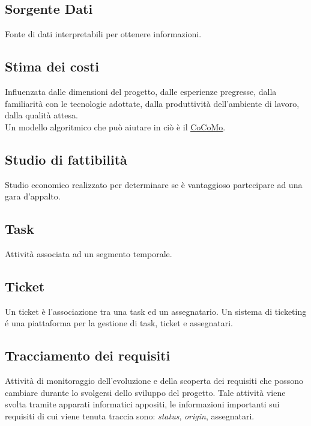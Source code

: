 	\subsection{Sorgente Dati}
	\label{sec:sorgentedati}
	Fonte di dati interpretabili per ottenere informazioni.
	
	
	\subsection{Stima dei costi}
	\label{sec:stimacosti}
	Influenzata dalle dimensioni del progetto, dalle esperienze pregresse, dalla familiarità con le tecnologie adottate, dalla produttività dell'ambiente di lavoro, dalla qualità attesa. \\Un modello algoritmico che può aiutare in ciò è il \underline{\hyperref[sec:cocomo]{CoCoMo}}.

	
	\subsection{Studio di fattibilità}
	\label{sec:studiofattibilita}
	Studio economico realizzato per determinare se è vantaggioso partecipare ad una gara d'appalto.
	
	
	\newpage
	
	
	\subsection{Task}
	\label{sec:task}
	Attività associata ad un segmento temporale.
		

	\subsection{Ticket}
	\label{sec:telegram}
	Un ticket è l'associazione tra una task ed un assegnatario. Un sistema di ticketing é una piattaforma per la gestione di task, ticket e assegnatari. 


	\subsection{Tracciamento dei requisiti}
	\label{sec:tracciamentorequisiti}
	Attività di monitoraggio dell'evoluzione e della scoperta dei requisiti che possono cambiare durante lo svolgersi dello sviluppo del progetto. Tale attività viene svolta tramite apparati informatici appositi, le informazioni importanti sui requisiti di cui viene tenuta traccia sono: \emph{status}, \emph{origin}, assegnatari.


